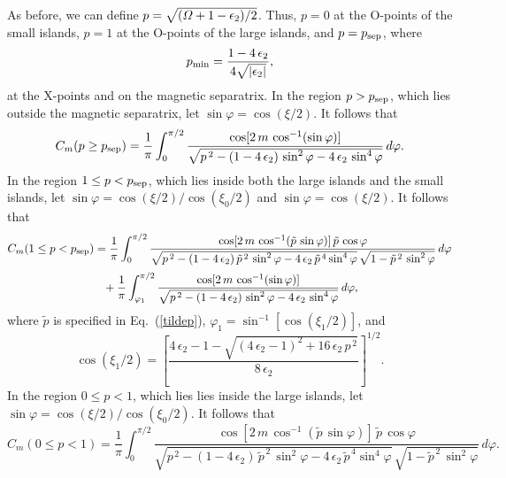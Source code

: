 \documentclass[12pt,prb,aps]{revtex4-1}
\begin{document}
As before, we can define $p=\sqrt{({\mit\Omega}+1-\epsilon_2)/2}$.  Thus, $p=0$ at the O-points of the small islands,  $p=1$ at the O-points of the large islands, and $p=p_{\rm sep}$, where
\begin{equation}
p_{\rm min} = \frac{1-4\,\epsilon_2}{4\sqrt{|\epsilon_2|}},
\end{equation}
at the X-points and on the magnetic separatrix. In the region $p>p_{\rm sep}$, which lies outside the  magnetic separatrix, let 
$\sin\varphi = \cos(\xi/2)$. 
It follows that 
\begin{equation}
 C_m(p\geq p_{\rm sep})=\frac{1}{\pi} \int_{0}^{\pi/2}\frac{\cos[2\,m\,\cos^{-1}(\sin\varphi)]}
 {\sqrt{p^{\,2}-(1-4\,\epsilon_2)\,\sin^2\varphi-4\,\epsilon_2\,\sin^4\varphi}}\,d\varphi.
\end{equation}
In the region $1\leq p< p_{\rm sep}$, which lies inside both the large islands and the small islands, let
$\sin\varphi = \cos(\xi/2)/\cos(\xi_0/2)$ and  $\sin\varphi = \cos(\xi/2)$. 
It follows that 
\begin{align}
 C_m(1\leq p <p_{\rm sep})&=\frac{1}{\pi} \int_{0}^{\pi/2}\frac{\cos[2\,m\,\cos^{-1}(\tilde{p}\,\sin\varphi)]\,\tilde{p}\,\cos\varphi}
 {\sqrt{p^{\,2}-(1-4\,\epsilon_2)\,\tilde{p}^{\,2}\,\sin^2\varphi-4\,\epsilon_2\,\tilde{p}^{\,4}\sin^4\varphi}\,\sqrt{1-\tilde{p}^{\,2}\,\sin^2\varphi}}\,d\varphi\nonumber\\[0.5ex]
 &\phantom{=} +\frac{1}{\pi} \int_{\varphi_1}^{\pi/2}\frac{\cos[2\,m\,\cos^{-1}(\sin\varphi)]}
 {\sqrt{p^{\,2}-(1-4\,\epsilon_2)\,\sin^2\varphi-4\,\epsilon_2\,\sin^4\varphi}}\,d\varphi,
\end{align}
where $\tilde{p}$ is specified in Eq.~(\ref{tildep}), 
$\varphi_1 = \sin^{-1}\left[\cos(\xi_1/2)\right]$,
and
\begin{equation}
\cos(\xi_1/2) = \left[\frac{4\,\epsilon_2-1-\sqrt{(4\,\epsilon_2-1)^2+16\,\epsilon_2\,p^{\,2}}}{8\,\epsilon_2}\right]^{1/2}.
\end{equation}
In the region $0\leq p < 1$, which lies lies inside the large  islands, 
 let 
$\sin\varphi = \cos(\xi/2)/\cos(\xi_0/2)$.
 It follows that 
\begin{equation}
 C_m(0\leq p< 1)=\frac{1}{\pi} \int_{0}^{\pi/2}\frac{\cos[2\,m\,\cos^{-1}(\tilde{p}\,\sin\varphi)]\,\tilde{p}\,\cos\varphi}
 {\sqrt{p^{\,2}-(1-4\,\epsilon_2)\,\tilde{p}^{\,2}\,\sin^2\varphi-4\,\epsilon_2\,\tilde{p}^{\,4}\sin^4\varphi}\,\sqrt{1-\tilde{p}^{\,2}\,\sin^2\varphi}}\,d\varphi.
\end{equation}
\end{document}
